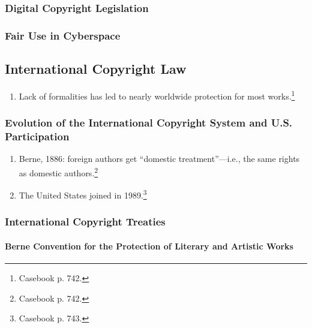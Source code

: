 \subsubsection{Digital Copyright Legislation}


\subsubsection{Fair Use in Cyberspace}


\subsection{International Copyright Law}

\begin{enumerate}
    \item Lack of formalities has led to nearly worldwide protection for most 
    works.\footnote{Casebook p. 742.}
\end{enumerate}

\subsubsection{Evolution of the International Copyright System and U.S. 
Participation}

\begin{enumerate}
    \item Berne, 1886: foreign authors get ``domestic treatment''---i.e., the 
    same rights as domestic authors.\footnote{Casebook p. 742.}
    \item The United States joined in 1989.\footnote{Casebook p. 743.}
\end{enumerate}

\subsubsection{International Copyright Treaties}

\paragraph{Berne Convention for the Protection of Literary and Artistic Works}

